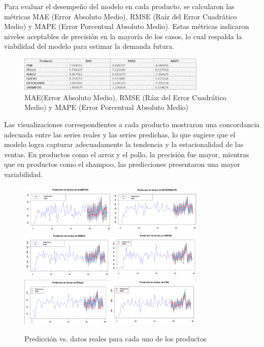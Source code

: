 \documentclass[12pt]{article}
\begin{document}
Para evaluar el desempeño del modelo en cada producto, se calcularon las métricas MAE (Error Absoluto Medio), RMSE (Raíz del Error Cuadrático Medio) y MAPE (Error Porcentual Absoluto Medio). Estas métricas indicaron niveles aceptables de precisión en la mayoría de los casos, lo cual respalda la viabilidad del modelo para estimar la demanda futura.
\begin{figure}[H]
    \centering
    \includegraphics[width=0.8\textwidth]{error.png}
    \caption{MAE(Error Absoluto Medio), RMSE (Ráız del Error Cuadrático Medio) y MAPE (Error Porcentual Absoluto Medio)}
\end{figure}
Las visualizaciones correspondientes a cada producto mostraron una concordancia adecuada entre las series reales y las series predichas, lo que sugiere que el modelo logra capturar adecuadamente la tendencia y la estacionalidad de las ventas. En productos como el arroz y el pollo, la precisión fue mayor, mientras que en productos como el shampoo, las predicciones presentaron una mayor variabilidad.



\begin{figure}[H]
    \centering
    \includegraphics[width=0.8\textwidth]{Ima11.png}
    \includegraphics[width=0.8\textwidth]{Ima22.png}
    \includegraphics[width=0.8\textwidth]{Ima33.png}
    \caption{Predicción vs. datos reales para cada uno de los productos}
\end{figure}
\end{document}
